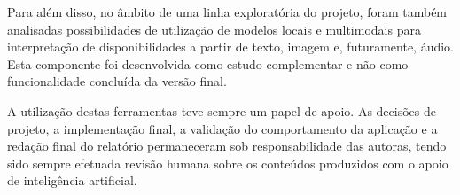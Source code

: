 \documentclass[a4paper,openright,twoside,11pt]{report}
\begin{document}
    Para além disso, no âmbito de uma linha exploratória do projeto, foram também analisadas possibilidades de utilização de modelos locais e multimodais para interpretação de disponibilidades a partir de texto, imagem e, futuramente, áudio.
    Esta componente foi desenvolvida como estudo complementar e não como funcionalidade concluída da versão final.

    A utilização destas ferramentas teve sempre um papel de apoio.
    As decisões de projeto, a implementação final, a validação do comportamento da aplicação e a redação final do relatório permaneceram sob responsabilidade das autoras, tendo sido sempre efetuada revisão humana sobre os conteúdos produzidos com o apoio de inteligência artificial.

    \cleardoublepage
    \tableofcontents \cleardoublepage

    \setcounter{page}{1}

    

    

    

    

    

    

    

    

    

    \nocite{kotlin-docs,android-architecture,jetpack-compose,room-docs,ktor-docs,postgresql-docs,google-calendar-api,bcrypt-paper,qwen25-vl,whisper,llava,asimov-multimodal}    
    

%
\end{document}
